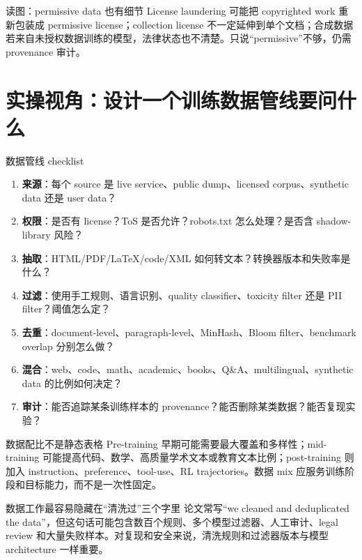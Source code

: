 \documentclass[a4paper]{article}
\begin{document}
\begin{warningbox}{读图：permissive data 也有细节}
License laundering 可能把 copyrighted work 重新包装成 permissive license；collection license 不一定延伸到单个文档；合成数据若来自未授权数据训练的模型，法律状态也不清楚。只说“permissive”不够，仍需 provenance 审计。
\end{warningbox}

\section{实操视角：设计一个训练数据管线要问什么}

\begin{importantbox}{数据管线 checklist}
\begin{enumerate}
    \item \textbf{来源}：每个 source 是 live service、public dump、licensed corpus、synthetic data 还是 user data？
    \item \textbf{权限}：是否有 license？ToS 是否允许？robots.txt 怎么处理？是否含 shadow-library 风险？
    \item \textbf{抽取}：HTML/PDF/LaTeX/code/XML 如何转文本？转换器版本和失败率是什么？
    \item \textbf{过滤}：使用手工规则、语言识别、quality classifier、toxicity filter 还是 PII filter？阈值怎么定？
    \item \textbf{去重}：document-level、paragraph-level、MinHash、Bloom filter、benchmark overlap 分别怎么做？
    \item \textbf{混合}：web、code、math、academic、books、Q\&A、multilingual、synthetic data 的比例如何决定？
    \item \textbf{审计}：能否追踪某条训练样本的 provenance？能否删除某类数据？能否复现实验？
\end{enumerate}
\end{importantbox}

\begin{knowledgebox}{数据配比不是静态表格}
Pre-training 早期可能需要最大覆盖和多样性；mid-training 可能提高代码、数学、高质量学术文本或教育文本比例；post-training 则加入 instruction、preference、tool-use、RL trajectories。数据 mix 应服务训练阶段和目标能力，而不是一次性固定。
\end{knowledgebox}

\begin{warningbox}{数据工作最容易隐藏在“清洗过”三个字里}
论文常写“we cleaned and deduplicated the data”，但这句话可能包含数百个规则、多个模型过滤器、人工审计、legal review 和大量失败样本。对复现和安全来说，清洗规则和过滤器版本与模型 architecture 一样重要。
\end{warningbox}
\end{document}
